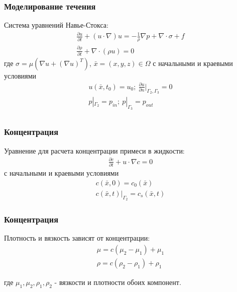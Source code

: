 \documentclass[14pt]{beamer}
\begin{document}
\begin{frame}
\frametitle{Моделирование течения}
Система уравнений Навье-Стокса:
\begin{gather}
    \label{eq:motion}
    \frac{\partial u}{\partial t} + (u \cdot \nabla) u = - \frac{1}{\rho} \nabla p + \nabla \cdot \sigma + f\\
    \label{eq:continuity}
    \frac{\partial \rho}{\partial t} + \nabla \cdot (\rho u) = 0
\end{gather}
где $\sigma = \mu (\nabla u + (\nabla u)^{T})$, $\bar{x} = (x, y, z) \in \Omega$ с начальными и краевыми условиями
\begin{gather*}
    u(\bar{x}, t_0) = u_0;\ \frac{\partial u}{\partial n}|_{\Gamma_2, \Gamma_3} = 0\\
    p|_{\Gamma_2} = p_{in};\ p|_{\Gamma_3} = p_{out} \\
\end{gather*}

\end{frame}

\begin{frame}
\frametitle{Концентрация}
Уравнение для расчета концентрации примеси в жидкости:
\begin{gather}
    \label{eq:concentration}
    \frac{\partial c}{\partial t} + u \cdot \nabla c = 0
\end{gather}
с начальными и краевыми условиями
\begin{gather*}
    c(\bar{x}, 0) = c_0(\bar{x})\\
    c(\bar{x}, t)|_{\Gamma_2} = c_s(\bar{x}, t)
\end{gather*}

\end{frame}

\begin{frame}
\frametitle{Концентрация}
Плотность и вязкость зависят от концентрации:
\begin{gather}
    \label{eq:concentration_viscosity}
    \mu = c (\mu_2 - \mu_1) + \mu_1\\
    \label{eq:concentration_density}
    \rho = c (\rho_2 - \rho_1) + \rho_1
\end{gather}

где $\mu_1, \mu_2, \rho_1, \rho_2$ - вязкости и плотности обоих компонент.
\end{frame}
\end{document}
